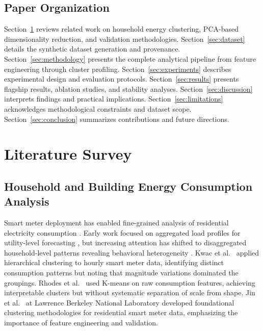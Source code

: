 \documentclass[11pt,a4paper]{article}
\begin{document}
\subsection{Paper Organization}

Section~\ref{sec:literature} reviews related work on household energy clustering, PCA-based dimensionality reduction, and validation methodologies. Section~\ref{sec:dataset} details the synthetic dataset generation and provenance. Section~\ref{sec:methodology} presents the complete analytical pipeline from feature engineering through cluster profiling. Section~\ref{sec:experiments} describes experimental design and evaluation protocols. Section~\ref{sec:results} presents flagship results, ablation studies, and stability analyses. Section~\ref{sec:discussion} interprets findings and practical implications. Section~\ref{sec:limitations} acknowledges methodological constraints and dataset scope. Section~\ref{sec:conclusion} summarizes contributions and future directions.

\section{Literature Survey}
\label{sec:literature}

\subsection{Household and Building Energy Consumption Analysis}

Smart meter deployment has enabled fine-grained analysis of residential electricity consumption \cite{kwac2014household,rhodes2014clustering}. Early work focused on aggregated load profiles for utility-level forecasting \cite{haben2016analysis}, but increasing attention has shifted to disaggregated household-level patterns revealing behavioral heterogeneity \cite{lazar2021investigating,jin2016loadshape}. Kwac et al.~\cite{kwac2014household} applied hierarchical clustering to hourly smart meter data, identifying distinct consumption patterns but noting that magnitude variations dominated the groupings. Rhodes et al.~\cite{rhodes2014clustering} used K-means on raw consumption features, achieving interpretable clusters but without systematic separation of scale from shape. Jin et al.~\cite{jin2016loadshape} at Lawrence Berkeley National Laboratory developed foundational clustering methodologies for residential smart meter data, emphasizing the importance of feature engineering and validation.
\end{document}
